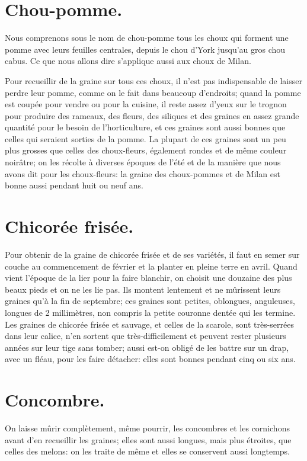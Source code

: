 \documentclass[10pt,a4paper]{book}
\begin{document}
\section{Chou-pomme.}

Nous comprenons sous le nom de chou-pomme tous les choux qui forment une pomme avec leurs feuilles centrales, depuis le chou d'York jusqu'au gros chou cabus. Ce que nous allons dire s'applique aussi aux choux de Milan.

Pour recueillir de la graine sur tous ces choux, il n'est pas indispensable de laisser perdre leur pomme, comme on le fait dans beaucoup d'endroits; quand la pomme est coupée pour vendre ou pour la cuisine, il reste assez d'yeux sur le trognon pour produire des rameaux, des fleurs, des siliques et des graines en assez grande quantité pour le besoin de l'horticulture, et ces graines sont aussi bonnes que celles qui seraient sorties de la pomme. La plupart de ces graines sont un peu plus grosses que celles des choux-fleurs, également rondes et de même couleur noirâtre; on les récolte à diverses époques de l'été et de la manière que nous avons dit pour les choux-fleurs: la graine des choux-pommes et de Milan est bonne aussi pendant huit ou neuf ans.

\section{Chicorée frisée.}

Pour obtenir de la graine de chicorée frisée et de ses variétés, il faut en semer sur couche au commencement de février et la planter en pleine terre en avril. Quand vient l'époque de la lier pour la faire blanchir, on choisit une douzaine des plus beaux pieds et on ne les lie pas. Ils montent lentement et ne mûrissent leurs graines qu'à la fin de septembre; ces graines sont petites, oblongues, anguleuses, longues de 2 millimètres, non compris la petite couronne dentée qui les termine. Les graines de chicorée frisée et sauvage, et celles de la scarole, sont très-serrées dans leur calice, n'en sortent que très-difficilement et peuvent rester plusieurs années sur leur tige sans tomber; aussi est-on obligé de les battre sur un drap, avec un fléau, pour les faire détacher: elles sont bonnes pendant cinq ou six ans.

\section{Concombre.}

On laisse mûrir complètement, même pourrir, les concombres et les cornichons avant d'en recueillir les graines; elles sont aussi longues, mais plus étroites, que celles des melons: on les traite de même et elles se conservent aussi longtemps.
\end{document}
